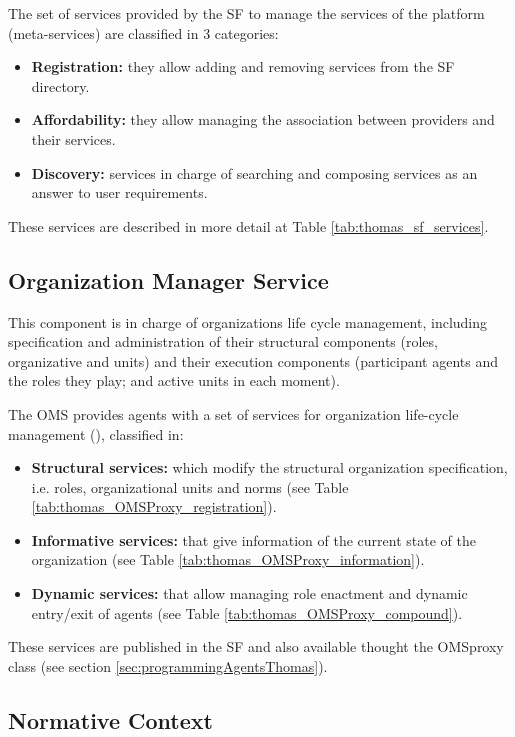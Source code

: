 The set of services provided by the SF to manage the services of the platform (meta-services) are classified in 3 categories:

\begin{itemize}
	\item \textbf{Registration:} they allow adding and removing services from the SF directory.
	\item \textbf{Affordability:} they allow managing the association between providers and their services.
	\item \textbf{Discovery:} services in charge of searching and composing services as an answer to user requirements.
\end{itemize}

These services are described in more detail at Table \ref{tab:thomas_sf_services}.

\subsection{Organization Manager Service}
This component is in charge of organizations life cycle management, including specification and administration of their structural components (roles, organizative and units) and their execution components (participant agents and the roles they play; and active units in each moment).

The OMS provides agents with a set of services for organization life-cycle management (\cite{DelVal09}), classified in:

\begin{itemize}
	\item \textbf{Structural services:} which modify the structural organization specification, i.e. roles, organizational units and norms (see Table \ref{tab:thomas_OMSProxy_registration}).
	\item \textbf{Informative services:} that give information of the current state of the organization (see Table \ref{tab:thomas_OMSProxy_information}).
	\item \textbf{Dynamic services:} that allow managing role enactment and dynamic entry/exit of agents (see Table \ref{tab:thomas_OMSProxy_compound}).
\end{itemize}

These services are  published in the SF and also available thought the OMSproxy class (see section \ref{sec:programmingAgentsThomas}).


\subsection{Normative Context}

